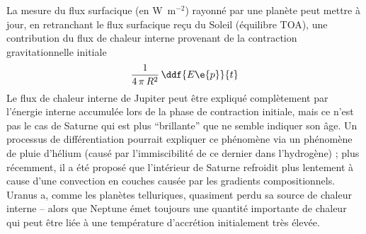 \sk
La mesure du flux surfacique (en W~m$^{-2}$) 
rayonné par une planète peut mettre à jour, en retranchant 
le flux surfacique reçu du Soleil (équilibre TOA), une contribution 
du flux de chaleur interne provenant de la contraction
gravitationnelle initiale
\[ \frac{1}{4\,\pi\,R^2}\,\ddf{E\e{p}}{t} \]
\noindent Le flux de chaleur interne de Jupiter peut être
expliqué complètement par l'énergie interne accumulée lors de la phase
de contraction initiale, mais ce n'est pas le cas de Saturne
qui est plus ``brillante'' que ne semble indiquer son âge.
Un processus de différentiation pourrait expliquer ce phénomène
via un phénomène de pluie d'hélium (causé par l'immiscibilité
de ce dernier dans l'hydrogène) ; plus récemment, il a été
proposé que l'intérieur de Saturne refroidit plus lentement
à cause d'une convection en couches causée par les
gradients compositionnels.
Uranus a, comme les planètes telluriques,
quasiment perdu sa source de chaleur interne -- alors
que Neptune émet toujours une quantité importante
de chaleur qui peut être liée à une température d'accrétion initialement très élevée.







